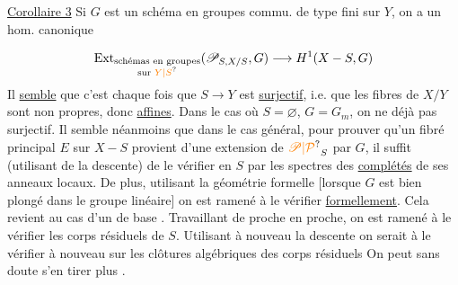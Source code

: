 \noindent\vrule\hspace{.6em}\begin{minipage}{.93\linewidth}
\uline{Corollaire 3} Si $G$ est un schéma en groupes commu. de type fini sur $Y$, on a un hom. canonique 
\end{minipage}\par
\[
\operatorname{Ext}_{\substack{\text{schémas en groupes}\\\text{sur }{\unsure{Y|S}}}}(\mathscr P_{S,X/S},G)\longrightarrow H^1(X-S,G)
\]
Il \uline{semble} que c’est \uline{{}} chaque fois que $S\longrightarrow Y$ est \uline{surjectif}, i.e. que les fibres de $X/Y$ sont non propres, donc \uline{affines}. Dans le cas où $S=\varnothing$, $G=G_m$, on ne {} déjà pas surjectif.
Il semble néanmoins que dans le cas général, pour prouver qu’un fibré principal $E$ sur $X-S$ provient d’une  extension de ${\unsure{\mathscr P|\mathcal P}}_S$ par $G$, il suffit (utilisant {} de la descente) de le vérifier en {} $S$ par les spectres des \uline{complétés} de ses anneaux locaux.
De plus, utilisant la géométrie formelle [lorsque $G$ est bien plongé dans le groupe  linéaire] on est ramené à le vérifier \uline{formellement}.
Cela revient au cas d’un {} de base {}. Travaillant de proche en proche, on est ramené à le vérifier {} \uline{{}} les corps résiduels de $S$.
Utilisant à nouveau la descente on serait {} à le vérifier à nouveau sur les clôtures algébriques des corps résiduels{} On peut sans doute s’en tirer plus {}.
